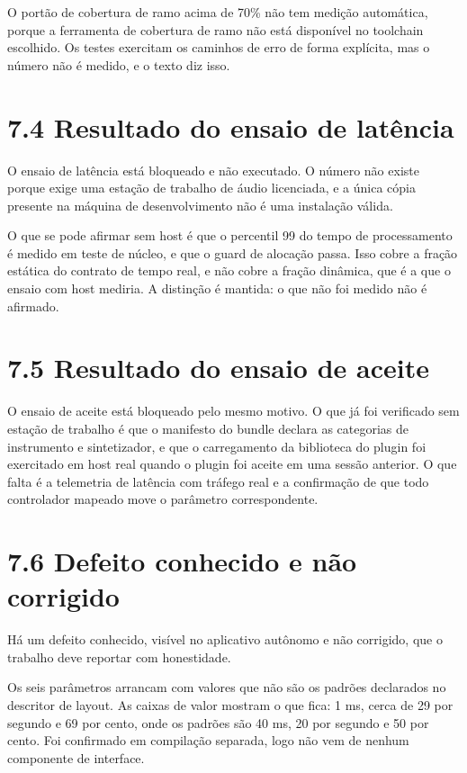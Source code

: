 \documentclass[12pt,a4paper]{article}
\begin{document}
O portão de cobertura de ramo acima de 70\% não tem medição automática, porque a ferramenta de cobertura de ramo não está disponível no toolchain escolhido. Os testes exercitam os caminhos de erro de forma explícita, mas o número não é medido, e o texto diz isso.


\section*{7.4 Resultado do ensaio de latência}

O ensaio de latência está bloqueado e não executado. O número não existe porque exige uma estação de trabalho de áudio licenciada, e a única cópia presente na máquina de desenvolvimento não é uma instalação válida.


O que se pode afirmar sem host é que o percentil 99 do tempo de processamento é medido em teste de núcleo, e que o guard de alocação passa. Isso cobre a fração estática do contrato de tempo real, e não cobre a fração dinâmica, que é a que o ensaio com host mediria. A distinção é mantida: o que não foi medido não é afirmado.


\section*{7.5 Resultado do ensaio de aceite}

O ensaio de aceite está bloqueado pelo mesmo motivo. O que já foi verificado sem estação de trabalho é que o manifesto do bundle declara as categorias de instrumento e sintetizador, e que o carregamento da biblioteca do plugin foi exercitado em host real quando o plugin foi aceite em uma sessão anterior. O que falta é a telemetria de latência com tráfego real e a confirmação de que todo controlador mapeado move o parâmetro correspondente.


\section*{7.6 Defeito conhecido e não corrigido}

Há um defeito conhecido, visível no aplicativo autônomo e não corrigido, que o trabalho deve reportar com honestidade.


Os seis parâmetros arrancam com valores que não são os padrões declarados no descritor de layout. As caixas de valor mostram o que fica: 1 ms, cerca de 29 por segundo e 69 por cento, onde os padrões são 40 ms, 20 por segundo e 50 por cento. Foi confirmado em compilação separada, logo não vem de nenhum componente de interface.
\end{document}
